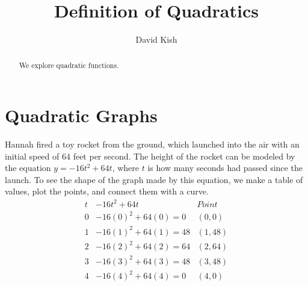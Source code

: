 \documentclass{ximera}
\author{David Kish}
\title{Definition of Quadratics}
\begin{document}
\begin{abstract}
We explore quadratic functions.
\end{abstract}
\maketitle
\section{Quadratic Graphs}
\begin{example}
      Hannah fired a toy rocket from the ground,
      which launched into the air with an initial speed of $64$ feet per second.
      The height of the rocket can be modeled by the equation $y=-16t^2+64t$,
      where $t$ is how many seconds had passed since the launch.
      To see the shape of the graph made by this equation,
      we make a table of values, plot the points, and connect them with a curve.\\
$$
\begin{array}{ccc}
                t & -16t^2+64t & Point\\
\hline
                 0 &  -16(0)^2+64(0) =0 & (0,0) \\
        1& -16(1)^2+64(1) =48&(1,48) \\
          2 & -16(2)^2+64(2) =64 &(2,64)\\
3&-16(3)^2+64(3)=48 &(3,48)\\
            4 & -16(4)^2+64(4)=0  &(4,0)
    \end{array}
$$
\begin{image}
\end{image}
\end{example}
\end{document}
